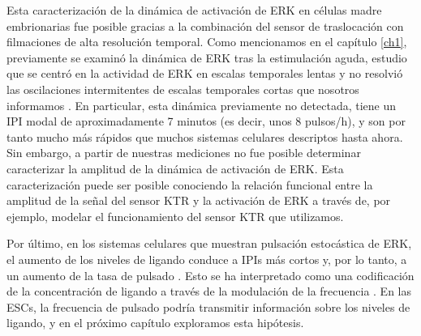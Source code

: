 \documentclass[./main.tex]{subfiles}
\begin{document}
Esta caracterización de la dinámica de activación de ERK en células madre embrionarias fue posible gracias a la combinación del sensor de traslocación con filmaciones de alta resolución temporal. Como mencionamos en el capítulo \ref{ch1}, previamente se examinó la dinámica de ERK tras la estimulación aguda, estudio que se centró en la actividad de ERK en escalas temporales lentas y no resolvió las oscilaciones intermitentes de escalas temporales cortas que nosotros informamos \cite{Deathridge2019}. En particular, esta dinámica previamente no detectada, tiene un IPI modal de aproximadamente 7 minutos (es decir, unos 8 pulsos/h), y son por tanto mucho más rápidos que muchos sistemas celulares descriptos hasta ahora. Sin embargo, a partir de nuestras mediciones no fue posible determinar caracterizar la amplitud de la dinámica de activación de ERK. Esta caracterización puede ser posible conociendo la relación funcional entre la amplitud de la señal del sensor KTR y la activación de ERK a través de, por ejemplo, modelar el funcionamiento del sensor KTR que utilizamos.


Por último, en los sistemas celulares que muestran pulsación estocástica de ERK, el aumento de los niveles de ligando conduce a IPIs más cortos y, por lo tanto, a un aumento de la tasa de pulsado \cite{Albeck2013}. Esto se ha interpretado como una codificación de la concentración de ligando a través de la modulación de la frecuencia \cite{Li2019}. En las ESCs, la frecuencia de pulsado podría transmitir información sobre los niveles de ligando, y en el próximo capítulo exploramos esta hipótesis.  
 
\end{document}
